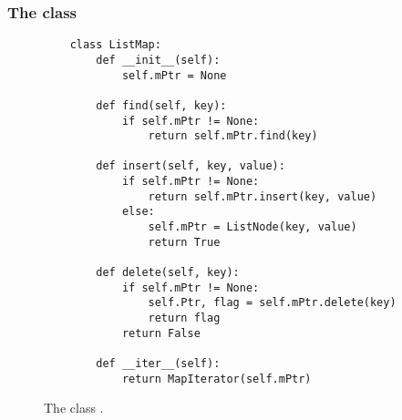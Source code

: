 \subsubsection{The class }
\begin{figure}[!ht]
\centering
\begin{verbatim}
    class ListMap:
        def __init__(self):
            self.mPtr = None
            
        def find(self, key):
            if self.mPtr != None:
                return self.mPtr.find(key)
            
        def insert(self, key, value):
            if self.mPtr != None:
                return self.mPtr.insert(key, value)
            else:
                self.mPtr = ListNode(key, value)
                return True
                
        def delete(self, key):
            if self.mPtr != None:
                self.Ptr, flag = self.mPtr.delete(key)
                return flag
            return False
                
        def __iter__(self):
            return MapIterator(self.mPtr)
\end{verbatim}
\vspace*{-0.3cm}
\caption{The class .}
\label{fig:ListMap.ipynb}
\end{figure}

